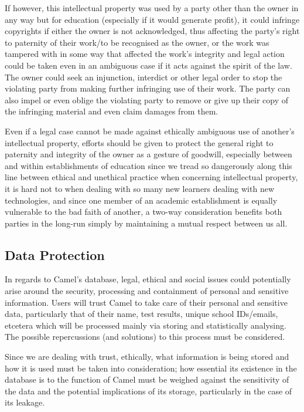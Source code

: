     If however, this intellectual property was used by a party other than the owner in any way but for education (especially if it would generate profit), it could infringe copyrights if either the owner is not acknowledged, thus affecting the party’s right to paternity of their work/to be recognised as the owner, or the work was tampered with in some way that affected the work’s integrity\cite{LSEPI in Computer Tech} and legal action could be taken even in an ambiguous case if it acts against the spirit of the law. The owner could seek an injunction, interdict or other legal order to stop the violating party from making further infringing use of their work. The party can also impel or even oblige the violating party to remove or give up their copy of the infringing material and even claim damages from them.\cite{JiscLegal - Intellectual Prop.}
    
    Even if a legal case cannot be made against ethically ambiguous use of another's intellectual property, efforts should be given to protect the general right to paternity and integrity of the owner as a gesture of goodwill, especially between and within establishments of education since we tread so dangerously along this line between ethical and unethical practice when concerning intellectual property, it is hard not to when dealing with so many new learners dealing with new technologies,\cite{JiscLegal - Intellectual Prop.} and since one member of an academic establishment is equally vulnerable to the bad faith of another, a two-way consideration benefits both parties in the long-run simply by maintaining a mutual respect between us all.

    \subsection*{Data Protection}
    In regards to Camel’s database, legal, ethical and social issues could potentially arise around the security, processing and containment of personal and sensitive information. Users will trust Camel to take care of their personal and sensitive data, particularly that of their name, test results, unique school IDs/emails, etcetera which will be processed mainly via storing and statistically analysing. The possible repercussions (and solutions) to this process must be considered.

    Since we are dealing with trust, ethically, what information is being stored and how it is used must be taken into consideration; how essential its existence in the database is to the function of Camel must be weighed against the sensitivity of the data and the potential implications of its storage, particularly in the case of its leakage.

